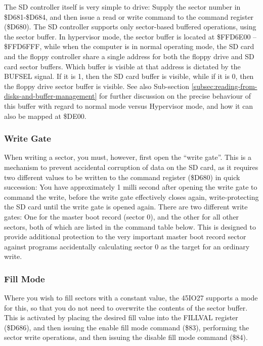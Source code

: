 The SD controller itself is very simple to drive: Supply the sector
number in \$D681-\$D684, and then issue a read or write command to the
command register (\$D680).  The SD controller supports only
sector-based buffered operations, using the sector buffer. In
hypervisor mode, the sector buffer is located at \$FFD6E00 --
\$FFD6FFF, while when the computer is in normal operating mode, the SD
card and the floppy controller share a single address for both the
floppy drive and SD card sector buffers. Which buffer is visible at
that address is dictated by the BUFSEL signal. If it is 1, then the SD
card buffer is visible, while if it is 0, then the floppy drive sector
buffer is visible.  See also Sub-section
\vref{subsec:reading-from-disks-and-buffer-management} for further
discussion on the precise behaviour of this buffer with regard to
normal mode versus Hypervisor mode, and how it can also be mapped at
\$DE00.

\subsubsection{Write Gate}

When writing a sector, you must, however, first open the ``write
gate''. This is a mechanism to prevent accidental corruption of data
on the SD card, as it requires two different values to be written to
the command register (\$D680) in quick succession: You have
approximately 1 milli second after opening the write gate to command
the write, before the write gate effectively closes again,
write-protecting the SD card until the write gate is opened again.
There are two different write gates: One for the master boot record
(sector 0), and the other for all other sectors, both of which are
listed in the command table below. This is designed to provide
additional protection to the very important master boot record sector
against programs accidentally calculating sector 0 as the target for
an ordinary write.

\subsubsection{Fill Mode}

Where you wish to fill sectors with a constant value, the 45IO27
supports a mode for this, so that you do not need to overwrite the
contents of the sector buffer. This is activated by placing the
desired fill value into the FILLVAL register (\$D686), and then
issuing the enable fill mode command (\$83), performing the sector
write operations, and then issuing the disable fill mode command
(\$84).

